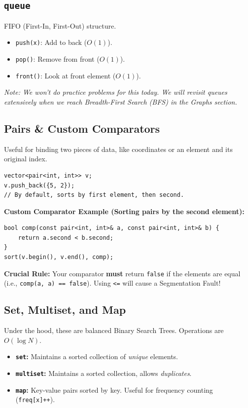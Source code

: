 \documentclass[12pt, a4paper]{article}
\begin{document}
\subsection{\texttt{queue}}
FIFO (First-In, First-Out) structure.
\begin{itemize}
    \item \texttt{push(x)}: Add to back ($O(1)$).
    \item \texttt{pop()}: Remove from front ($O(1)$).
    \item \texttt{front()}: Look at front element ($O(1)$).
\end{itemize}
\textit{Note: We won't do practice problems for this today. We will revisit queues extensively when we reach Breadth-First Search (BFS) in the Graphs section.}

\subsection{Pairs \& Custom Comparators}
Useful for binding two pieces of data, like coordinates or an element and its original index.

\begin{lstlisting}
vector<pair<int, int>> v;
v.push_back({5, 2});
// By default, sorts by first element, then second.
\end{lstlisting}

\textbf{Custom Comparator Example (Sorting pairs by the second element):}
\begin{lstlisting}
bool comp(const pair<int, int>& a, const pair<int, int>& b) {
    return a.second < b.second; 
}
sort(v.begin(), v.end(), comp);
\end{lstlisting}
\textbf{Crucial Rule:} Your comparator \textbf{must} return \texttt{false} if the elements are equal (i.e., \texttt{comp(a, a) == false}). Using \texttt{<=} will cause a Segmentation Fault!

\subsection{Set, Multiset, and Map}
Under the hood, these are balanced Binary Search Trees. Operations are $O(\log N)$.
\begin{itemize}
    \item \textbf{\texttt{set}:} Maintains a sorted collection of \textit{unique} elements.
    \item \textbf{\texttt{multiset}:} Maintains a sorted collection, allows \textit{duplicates}.
    \item \textbf{\texttt{map}:} Key-value pairs sorted by key. Useful for frequency counting (\texttt{freq[x]++}).
\end{itemize}
\end{document}
